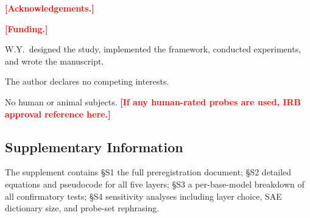 \documentclass[pdflatex,sn-mathphys-num]{sn-jnl}
\newcommand{\PLACE}[1]{\textcolor{red}{\textbf{[#1]}}}
\theoremstyle{thmstyleone}
\theoremstyle{thmstylethree}
\begin{document}
\PLACE{Acknowledgements.}

\PLACE{Funding.}

W.Y.\ designed the study, implemented the framework, conducted experiments, and wrote the manuscript.

The author declares no competing interests.

No human or animal subjects. \PLACE{If any human-rated probes are used, IRB approval reference here.}

\begin{appendices}

\section*{Supplementary Information}
The supplement contains §S1 the full preregistration document; §S2 detailed equations and pseudocode for all five layers; §S3 a per-base-model breakdown of all confirmatory tests; §S4 sensitivity analyses including layer choice, SAE dictionary size, and probe-set rephrasing.

\end{appendices}



\end{document}
